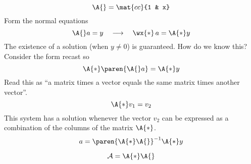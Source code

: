   \begin{equation}
    \A{} = \mat{cc}{1 & x}
  \end{equation}
Form the normal equations
  \begin{equation}
    \A{} a = y \quad \longrightarrow \quad \wx{*}\,a = \A{*}y
  \end{equation}
The existence of a solution (when $y\ne0$) is guaranteed. How do we know this? 
Consider the form recast so
  \begin{equation}
    \A{*} \paren{\A{}a} = \A{*} y
  \end{equation}
Read this as ``a matrix times a vector equals the same matrix times another vector''.
  \begin{equation}
    \A{*} v_{1} = v_{2}
  \end{equation}
This system has a solution whenever the vector $v_{2}$ can be expressed as a combination of the columns of the matrix $\A{*}$. 
  \begin{equation}
    a = \paren{\A{*}\A{}}^{-1}\A{*}y
  \end{equation}


  \begin{equation}
    \mathcal{A} = \A{*}\A{}
  \end{equation}


\endinput  %

